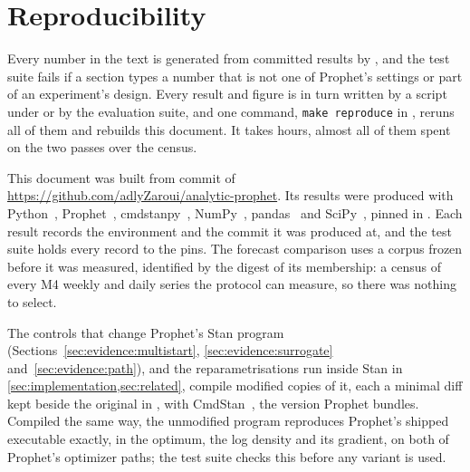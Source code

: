 \section{Reproducibility}
\label{sec:reproducibility}

Every number in the text is generated from committed results by
, and the test suite fails if a section types
a number that is not one of Prophet's settings or part of an experiment's design. Every
result and figure is in turn written by a script under  or by
the evaluation suite, and one command, \texttt{make reproduce} in , reruns
all of them and rebuilds this document. It takes hours, almost all of them spent on the
two passes over the census.

This document was built from commit \texttt{\BuildCommit} of
\url{https://github.com/adlyZaroui/analytic-prophet}. Its results were produced with
Python~\EnvPython, Prophet~\EnvProphet, cmdstanpy~\EnvCmdstanpy, NumPy~\EnvNumpy,
pandas~\EnvPandas{} and SciPy~\EnvScipy, pinned in . Each
result records the environment and the commit it was produced at, and the test suite
holds every record to the pins. The forecast comparison uses a corpus frozen before it
was measured, identified by the digest \texttt{\CensusDigest} of its membership: a
census of every M4 weekly and daily series the protocol can measure, so there was
nothing to select.

The controls that change Prophet's Stan program
(Sections~\ref{sec:evidence:multistart}, \ref{sec:evidence:surrogate}
and~\ref{sec:evidence:path}), and the reparametrisations run inside Stan in
\cref{sec:implementation,sec:related}, compile modified copies of it, each a minimal
diff kept beside the original in , with CmdStan~\EnvCmdStan, the
version Prophet bundles. Compiled the same way, the unmodified program reproduces Prophet's
shipped executable exactly, in the optimum, the log density and its gradient, on both
of Prophet's optimizer paths; the test suite checks this before any variant is used.
